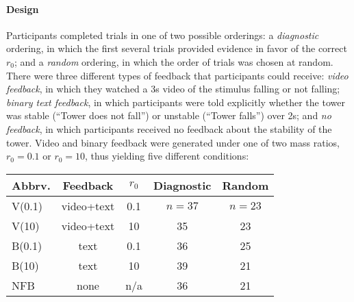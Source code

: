 \documentclass[10pt,letterpaper]{article}
\newcommand{\rlow}[0]{$r_0=0.1$}
\newcommand{\rhigh}[0]{$r_0=10$}
\newcommand{\vfblow}[0]{V(0.1)}
\newcommand{\vfbhigh}[0]{V(10)}
\newcommand{\fblow}[0]{B(0.1)}
\newcommand{\fbhigh}[0]{B(10)}
\newcommand{\nfb}[0]{NFB}
\begin{document}
\paragraph{Design}

Participants completed trials in one of two possible orderings: a
\textit{diagnostic} ordering, in which the first several trials
provided evidence in favor of the correct $r_0$; and a \textit{random}
ordering, in which the order of trials was chosen at random. There
were three different types of feedback that participants could
receive: \textit{video feedback}, in which they watched a 3s video of
the stimulus falling or not falling; \textit{binary text feedback}, in
which participants were told explicitly whether the tower was stable
(``Tower does not fall'') or unstable (``Tower falls'') over 2s; and
\textit{no feedback}, in which participants received no feedback about
the stability of the tower. Video and binary feedback were generated
under one of two mass ratios, \rlow{} or \rhigh{}, thus yielding five
different conditions:



\begin{table}[h]
  \begin{center}
    \begin{tabular}{|l||cccc|}\hline
      Abbrv. & Feedback & $r_0$ & Diagnostic & Random\\\hline
      \vfblow{} & video+text & 0.1 & $n=37$ & $n=23$\\
      \vfbhigh{} & video+text & 10 & 35 & 23\\
      \fblow{} & text & 0.1 & 36 & 25\\
      \fbhigh{} & text & 10 & 39 & 21\\
      \nfb{} & none & n/a & 36 & 21\\
      \hline 
    \end{tabular}
  \end{center}
\end{table}
\end{document}
